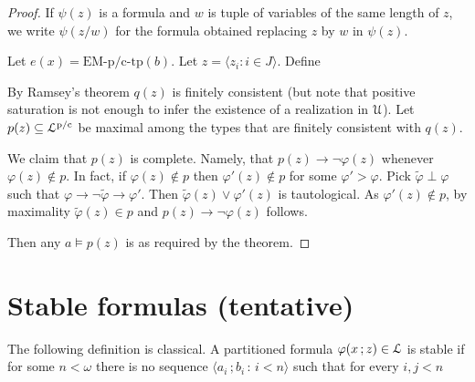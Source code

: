\documentclass{amsproc}
\begin{document}
{\begin{proof}
  If $\psi(z)$ is a formula and $w$ is tuple of variables of the same length of $z$, we write $\psi(z/w)$ for the formula obtained replacing $z$ by $w$ in $\psi(z)$.

  Let $e(x)=\mbox{EM-p/c-tp}(b)$.
  Let $z=\langle z_i:i\in J\rangle$.
  Define



  By Ramsey's theorem $q(z)$ is finitely consistent (but note that positive saturation is not enough to infer the existence of a realization in ${\EuScript U}$).
  Let $p(z)\subseteq{\EuScript L}^{\rm p/c}$ be maximal among the types that are finitely consistent with $q(z)$.

  We claim that $p(z)$ is complete.
  Namely, that $p(z)\rightarrow\neg\varphi(z)$ whenever $\varphi(z)\notin p$.
  In fact, if $\varphi(z)\notin p$ then $\varphi'(z)\notin p$ for some $\varphi'>\varphi$.
  Pick $\tilde\varphi\perp\varphi$ such that $\varphi\rightarrow\neg\tilde\varphi\rightarrow\varphi'$.
  Then $\tilde\varphi(z)\vee\varphi'(z)$ is tautological.
  As $\varphi'(z)\notin p$, by maximality $\tilde\varphi(z)\in p$ and $p(z)\rightarrow\neg\varphi(z)$ follows.

  Then any $a\models p(z)$ is as required by the theorem.
\end{proof}


\section{Stable formulas (tentative)}

\def\ceq#1#2#3{\parbox[t]{20ex}{$\displaystyle #1$}\parbox[t]{6ex}{$\displaystyle\hfil #2$}{$\displaystyle #3$}}

The following definition is classical.
A partitioned formula $\varphi(x\,;z)\in{\EuScript L}$ is stable if for some $n<\omega$ there is no sequence $\langle a_i\,;b_i\,:\,i<n\rangle$ such that for every $i,j<n$

}
\end{document}
